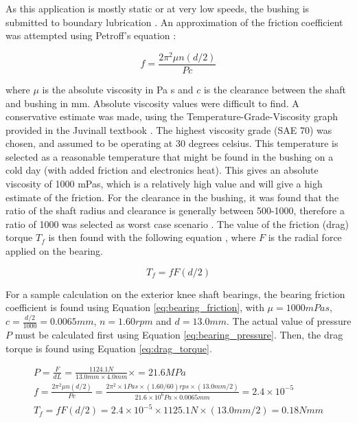 As this application is mostly static or at very low speeds, the bushing is submitted to boundary lubrication \cite{juvinall_fundamentals_2012}. An approximation of the friction coefficient was attempted using Petroff's equation \cite{juvinall_fundamentals_2012}:

\begin{equation}
    f=\frac{2\pi ^2\mu n(d/2)}{Pc} \label{eq:bearing_friction}
\end{equation}{}

where $\mu $ is the absolute viscosity in Pa s and $c$ is the clearance between the shaft and bushing in mm. Absolute viscosity values were difficult to find. A conservative estimate was made, using the Temperature-Grade-Viscosity graph provided in the Juvinall textbook \cite{juvinall_fundamentals_2012}. The highest viscosity grade (SAE 70) was chosen, and assumed to be operating at 30 degrees celsius. This temperature is selected as a reasonable temperature that might be found in the bushing on a cold day (with added friction and electronics heat). This gives an absolute viscosity of 1000 mPas, which is a relatively high value and will give a high estimate of the friction. For the clearance in the bushing, it was found that the ratio of the shaft radius and clearance is generally between 500-1000, therefore a ratio of 1000 was selected as worst case scenario \cite{juvinall_fundamentals_2012}. The value of the friction (drag) torque $T_f$ is then found with the following equation \cite{juvinall_fundamentals_2012}, where $F$ is the radial force applied on the bearing.

\begin{equation}
    T_f=fF(d/2) \label{eq:drag_torque}
\end{equation}{}

For a sample calculation on the exterior knee shaft bearings, the bearing friction coefficient is found using Equation \ref{eq:bearing_friction}, with $\mu = 1000mPas$, $c = \frac{d/2}{1000}=0.0065 mm$, $n=1.60 rpm$ and $d=13.0 mm$. The actual value of pressure $P$ must be calculated first using Equation \ref{eq:bearing_pressure}. Then, the drag torque is found using Equation \ref{eq:drag_torque}.

\begin{gather}
    P=\frac{F}{dL} = \frac{1124.1 N}{13.0 mm\times 4.0 mm}\times=21.6 MPa
    \\
    f=\frac{2\pi ^2\mu n(d/2)}{Pc}=\frac{2\pi ^2\times 1Pas\times (1.60/60) rps \times (13.0 mm/2)}{21.6 \times 10^6 Pa \times 0.0065 mm} = 2.4\times 10^{-5}
    \\
    T_f=fF(d/2)=2.4\times 10^{-5}\times 1125.1 N\times(13.0 mm/2)=0.18 Nmm
\end{gather}

